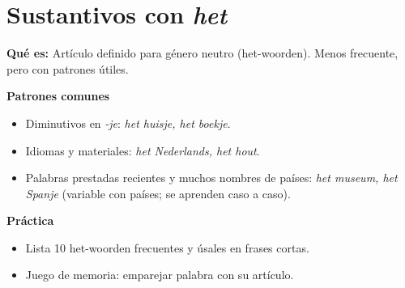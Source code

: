 \section{Sustantivos con \textit{het}}
\textbf{Qué es:} Artículo definido para género neutro (het-woorden). Menos frecuente, pero con patrones útiles.

\textbf{Patrones comunes}
\begin{itemize}[leftmargin=*]
  \item Diminutivos en \textit{-je}: \textit{het huisje, het boekje}.
  \item Idiomas y materiales: \textit{het Nederlands, het hout}.
  \item Palabras prestadas recientes y muchos nombres de países: \textit{het museum, het Spanje} (variable con países; se aprenden caso a caso).
\end{itemize}

\textbf{Práctica}
\begin{itemize}[leftmargin=*]
  \item Lista 10 het-woorden frecuentes y úsales en frases cortas.
  \item Juego de memoria: emparejar palabra con su artículo.
\end{itemize}
